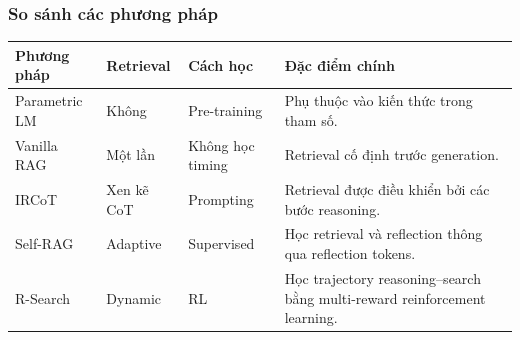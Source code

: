 \begin{frame}
    \frametitle{So sánh các phương pháp}

    \small

    \begin{center}
    \renewcommand{\arraystretch}{1.4}

    \begin{tabular}{p{2.3cm} p{2.2cm} p{2.3cm} p{5.2cm}}
        \toprule
        \textbf{Phương pháp} &
        \textbf{Retrieval} &
        \textbf{Cách học} &
        \textbf{Đặc điểm chính} \\
        \midrule

        Parametric LM
        &
        Không
        &
        Pre-training
        &
        Phụ thuộc vào kiến thức trong tham số.
        \\

        Vanilla RAG
        &
        Một lần
        &
        Không học timing
        &
        Retrieval cố định trước generation.
        \\

        IRCoT
        &
        Xen kẽ CoT
        &
        Prompting
        &
        Retrieval được điều khiển bởi các bước reasoning.
        \\

        Self-RAG
        &
        Adaptive
        &
        Supervised
        &
        Học retrieval và reflection thông qua
        reflection tokens.
        \\

        R-Search
        &
        Dynamic
        &
        RL
        &
        Học trajectory reasoning--search bằng
        multi-reward reinforcement learning.
        \\

        \bottomrule
    \end{tabular}
    \end{center}

\end{frame}



